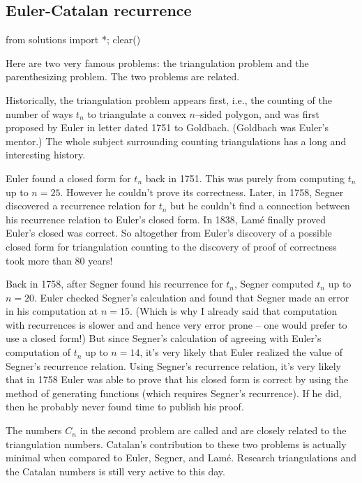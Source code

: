 \subsection{Euler-Catalan recurrence}
\begin{python0}
from solutions import *; clear() 
\end{python0}


Here are two very famous problems: the triangulation problem
and the parenthesizing problem.
The two problems are related.

Historically, the triangulation problem appears first, i.e.,
the counting of the number of ways $t_n$ to triangulate a convex $n$--sided
polygon,
and was first proposed by Euler in letter dated 1751 to Goldbach.
(Goldbach was Euler’s mentor.)
The whole subject surrounding counting triangulations has a
long and interesting history.

Euler found a closed form for $t_n$ back in 1751.
This was purely from computing $t_n$ up to $n = 25$.
However he couldn't prove its correctness.
Later, in 1758, Segner discovered a recurrence relation
for $t_n$ but he couldn't find a connection between his recurrence
relation to Euler's closed form.
In 1838, Lam\'e finally proved Euler's closed was correct.
So altogether from Euler's discovery of a possible closed form
for triangulation counting to the discovery of proof of correctness took more
than 80 years!

Back in 1758, after Segner found his recurrence for $t_n$,
Segner computed $t_n$ up to $n = 20$.
Euler checked Segner's calculation and found that Segner
made an error in his computation at $n = 15$.
(Which is why I already said that computation with
recurrences is slower and and hence
very error prone -- one would prefer to use a closed form!)
But since Segner's calculation of agreeing with Euler's computation
of $t_n$ up to $n = 14$, it's very likely that
Euler realized the value of Segner's recurrence relation.
Using Segner's recurrence relation, it's very likely that
in 1758 Euler was able to prove that his closed form is
correct by using the method of generating functions (which
requires Segner's recurrence).
If he did, then he probably never found time to publish
his proof.

The numbers $C_n$ in the second problem are called
 and are closely related to the
triangulation numbers.
Catalan's contribution to these two problems is actually
minimal when compared to Euler, Segner, and Lam\'e.
Research triangulations and the Catalan numbers is still very active
to this day.




